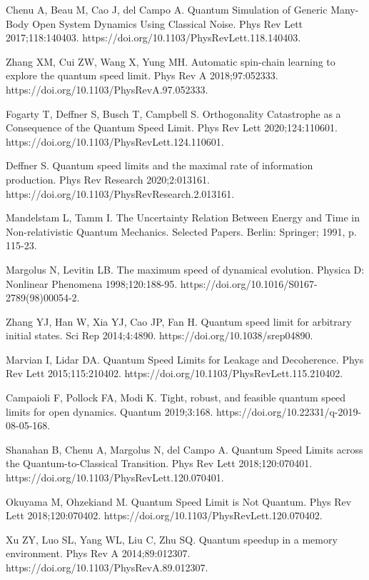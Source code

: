 \documentclass[
showpacs,  %
showkeys,  %
aps,       %
amsthm,    %
amsmath,   %
amsfonts,  %
amssymb    %
]{revtex4-1}          %
\begin{document}
\begin{thebibliography}{}
Chenu A, Beau M, Cao J, del Campo A. Quantum Simulation of Generic Many-Body Open System Dynamics Using Classical Noise. Phys Rev Lett 2017;118:140403. https://doi.org/10.1103/PhysRevLett.118.140403.

Zhang XM, Cui ZW, Wang X, Yung MH. Automatic spin-chain learning to explore the quantum speed limit. Phys Rev A 2018;97:052333. https://doi.org/10.1103/PhysRevA.97.052333.

Fogarty T, Deffner S, Busch T, Campbell S. Orthogonality Catastrophe as a Consequence of the Quantum Speed Limit. Phys Rev Lett 2020;124:110601. https://doi.org/10.1103/PhysRevLett.124.110601.

Deffner S. Quantum speed limits and the maximal rate of information production. Phys Rev Research 2020;2:013161. https://doi.org/10.1103/PhysRevResearch.2.013161.

Mandelstam L, Tamm I. The Uncertainty Relation Between Energy and Time in Non-relativistic Quantum Mechanics. Selected Papers. Berlin: Springer; 1991, p. 115-23.

Margolus N, Levitin LB. The maximum speed of dynamical evolution. Physica D: Nonlinear Phenomena 1998;120:188-95. https://doi.org/10.1016/S0167-2789(98)00054-2.

Zhang YJ, Han W, Xia YJ, Cao JP, Fan H. Quantum speed limit for arbitrary initial states. Sci Rep 2014;4:4890. https://doi.org/10.1038/srep04890.

Marvian I, Lidar DA. Quantum Speed Limits for Leakage and Decoherence. Phys Rev Lett 2015;115:210402. https://doi.org/10.1103/PhysRevLett.115.210402.

Campaioli F, Pollock FA, Modi K. Tight, robust, and feasible quantum speed limits for open dynamics. Quantum 2019;3:168. https://doi.org/10.22331/q-2019-08-05-168.

Shanahan B, Chenu A, Margolus N, del Campo A. Quantum Speed Limits across the Quantum-to-Classical Transition. Phys Rev Lett 2018;120:070401. https://doi.org/10.1103/PhysRevLett.120.070401.

Okuyama M, Ohzekiand M. Quantum Speed Limit is Not Quantum. Phys Rev Lett 2018;120:070402. https://doi.org/10.1103/PhysRevLett.120.070402.

Xu ZY, Luo SL, Yang WL, Liu C, Zhu SQ. Quantum speedup in a memory environment. Phys Rev A 2014;89:012307. https://doi.org/10.1103/PhysRevA.89.012307.


\end{thebibliography}
\end{document}
